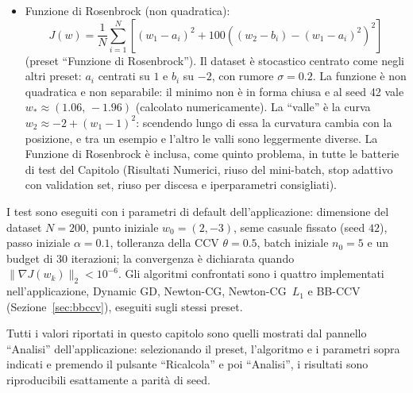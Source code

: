 \documentclass[a4paper,12pt]{article}
\numberwithin{equation}{section}
\numberwithin{figure}{section}
\numberwithin{table}{section}
\begin{document}
\begin{itemize}
  \item Funzione di Rosenbrock (non quadratica):
  \[
  J(w) = \frac{1}{N}\sum_{i=1}^{N}\left[(w_1 - a_i)^2
    + 100\left((w_2 - b_i) - (w_1 - a_i)^2\right)^2\right]
  \]
  (preset ``Funzione di Rosenbrock''). Il dataset è stocastico centrato come
  negli altri preset: $a_i$ centrati su $1$ e $b_i$ su $-2$, con rumore
  $\sigma = 0.2$. La funzione è non quadratica e non separabile: il minimo
  non è in forma chiusa e al seed 42 vale $w_* \approx (1.06,\,-1.96)$
  (calcolato numericamente). La ``valle'' è la curva
  $w_2 \approx -2 + (w_1 - 1)^2$: scendendo lungo di essa la curvatura cambia
  con la posizione, e tra un esempio e l'altro le valli sono leggermente
  diverse. La Funzione di Rosenbrock è inclusa, come quinto problema, in tutte le batterie di
  test del Capitolo (Risultati Numerici, riuso del mini-batch, stop adattivo
  con validation set, riuso per discesa e iperparametri consigliati).
\end{itemize}

I test sono eseguiti con i parametri di default dell'applicazione:
dimensione del dataset $N = 200$, punto iniziale $w_0 = (2,-3)$, seme
casuale fissato (seed $42$), passo iniziale $\alpha = 0.1$, tolleranza della
CCV $\theta = 0.5$, batch iniziale $n_0 = 5$ e un budget di 30 iterazioni; la
convergenza è dichiarata quando $\|\nabla J(w_k)\|_2 < 10^{-6}$. Gli algoritmi
confrontati sono i quattro implementati nell'applicazione, Dynamic GD,
Newton-CG, Newton-CG~$L_1$ e BB-CCV (Sezione~\ref{sec:bbccv}), eseguiti
sugli stessi preset.

Tutti i valori riportati in questo capitolo sono quelli mostrati dal pannello
``Analisi'' dell'applicazione: selezionando il preset, l'algoritmo e i
parametri sopra indicati e premendo il pulsante ``Ricalcola'' e poi
``Analisi'', i risultati sono riproducibili esattamente a parità di seed.
\end{document}
